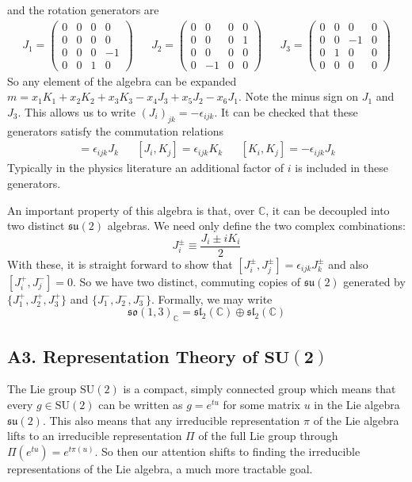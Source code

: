 \documentclass[onecolumn]{gwclass}
\renewcommand{\t}[1]{\text{#1}}
\newcommand{\C}{\mathbb{C}}
\begin{document}
and the rotation generators are
\begin{align*}
J_1= \begin{pmatrix}
	0&0&0&0\\
	0&0&0&0\\
	0&0&0&-1\\
	0&0&1&0
\end{pmatrix} && J_2= \begin{pmatrix}
0&0&0&0\\
0&0&0&1\\
0&0&0&0\\
0&-1&0&0
\end{pmatrix} && J_3=\begin{pmatrix}
0&0&0&0\\
0&0&-1&0\\
0&1&0&0\\
0&0&0&0
\end{pmatrix}
\end{align*}
So any element of the algebra can be expanded $ m = x_1K_1 + x_2K_2 + x_3K_3 - x_4J_3 + x_5 J_2 - x_6 J_1 $. Note the minus sign on $J_1$ and $J_3$. This allows us to write $(J_i)_{jk} = -\epsilon_{ijk}$. It can be checked that these generators satisfy the commutation relations
\begin{align*}
	[J_i,J_j] = \epsilon_{ijk}J_k && [J_i, K_j] = \epsilon_{ijk}K_k && [K_i, K_j] = -	\epsilon_{ijk}J_k
\end{align*}
Typically in the physics literature an additional factor of $i$ is included in these generators. 

An important property of this algebra is that, over $\C$, it can be decoupled into two distinct $\mathfrak{su}(2)$ algebras. We need only define the two complex combinations:
$$ J^\pm_i \equiv \frac{J_i \pm iK_i}{2} $$
With these, it is straight forward to show that $[J^\pm_i, J^\pm_j] = \epsilon_{ijk}J^\pm_k$ and also $[J_i^+, J_j^-]=0$. So we have two distinct, commuting copies of $\mathfrak{su}(2)$ generated by $\{J^+_1, J^+_2, J^+_3\}$ and $\{J^-_1, J^-_2, J^-_3\}$. Formally, we may write
$$ \mathfrak{so}(1,3)_\mathbb{C}=\mathfrak{sl}_2(\mathbb{C})\oplus\mathfrak{sl}_2(\mathbb{C}) $$

\newpage
\subsection{A3. Representation Theory of $\boldsymbol{\t{SU}(2)}$}
The Lie group $\t{SU}(2)$ is a compact, simply connected group which means that every $g\in\t{SU}(2)$ can be written as $g=e^{tu}$ for some matrix $u$ in the Lie algebra $\mathfrak{su}(2)$. This also means that any irreducible representation $\pi$ of the Lie algebra lifts to an irreducible representation $\Pi$ of the full Lie group through $\Pi(e^{tu}) = e^{t\pi(u)}$. So then our attention shifts to finding the irreducible representations of the Lie algebra, a much more tractable goal. 
\end{document}
